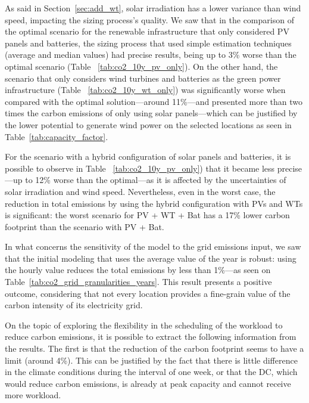 
As said in Section~\ref{sec:add_wt}, solar irradiation has a lower variance than wind speed, impacting the sizing process's quality. We saw that in the comparison of the optimal scenario for the renewable infrastructure that only considered PV panels and batteries, the sizing process that used simple estimation techniques (average and median values) had precise results, being up to 3\% worse than the optimal scenario (Table ~\ref{tab:co2_10y_pv_only}). On the other hand, the scenario that only considers wind turbines and batteries as the green power infrastructure (Table ~\ref{tab:co2_10y_wt_only}) was significantly worse when compared with the optimal solution---around 11\%---and presented more than two times the carbon emissions of only using solar panels---which can be justified by the lower potential to generate wind power on the selected locations as seen in Table~\ref{tab:capacity_factor}. 

For the scenario with a hybrid configuration of solar panels and batteries, it is possible to observe in Table ~\ref{tab:co2_10y_pv_only}) that it became less precise---up to 12\% worse than the optimal---as it is affected by the uncertainties of solar irradiation and wind speed. Nevertheless, even in the worst case, the reduction in total  emissions by using the hybrid configuration with PVs and WTs is significant: the worst scenario for PV + WT + Bat has a 17\% lower carbon footprint than the scenario with PV + Bat.


In what concerns the sensitivity of the model to the grid emissions input, we saw that the initial modeling that uses the average value of the year is robust: using the hourly value reduces the total  emissions by less than 1\%---as seen on Table~\ref{tab:co2_grid_granularities_years}. This result presents a positive outcome, considering that not every location provides a fine-grain value of the carbon intensity of its electricity grid.

On the topic of exploring the flexibility in the scheduling of the workload to reduce carbon emissions, it is possible to extract the following information from the results. The first is that the reduction of the carbon footprint seems to have a limit (around 4\%). This can be justified by the fact that there is little difference in the climate conditions during the interval of one week, or that the DC, which would reduce carbon emissions, is already at peak capacity and cannot receive more workload. 

